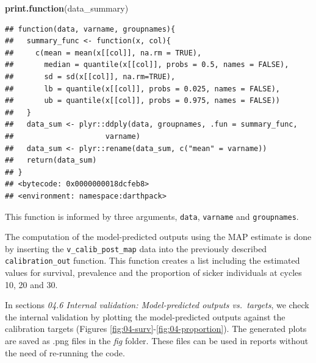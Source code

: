 \documentclass[]{book}
\newenvironment{Shaded}{\begin{snugshade}}{\end{snugshade}}
\newcommand{\KeywordTok}[1]{\textcolor[rgb]{0.13,0.29,0.53}{\textbf{#1}}}
\newcommand{\NormalTok}[1]{#1}
\begin{document}
\begin{Shaded}
\begin{Highlighting}[]
\KeywordTok{print.function}\NormalTok{(data_summary)}
\end{Highlighting}
\end{Shaded}

\begin{verbatim}
## function(data, varname, groupnames){
##   summary_func <- function(x, col){
##     c(mean = mean(x[[col]], na.rm = TRUE),
##       median = quantile(x[[col]], probs = 0.5, names = FALSE),
##       sd = sd(x[[col]], na.rm=TRUE),
##       lb = quantile(x[[col]], probs = 0.025, names = FALSE),
##       ub = quantile(x[[col]], probs = 0.975, names = FALSE))
##   }
##   data_sum <- plyr::ddply(data, groupnames, .fun = summary_func, 
##                     varname)
##   data_sum <- plyr::rename(data_sum, c("mean" = varname))
##   return(data_sum)
## }
## <bytecode: 0x0000000018dcfeb8>
## <environment: namespace:darthpack>
\end{verbatim}

This function is informed by three arguments, \texttt{data}, \texttt{varname} and \texttt{groupnames}.

The computation of the model-predicted outputs using the MAP estimate is done by inserting the \texttt{v\_calib\_post\_map} data into the previously described \texttt{calibration\_out} function. This function creates a list including the estimated values for survival, prevalence and the proportion of sicker individuals at cycles 10, 20 and 30.

In sections \emph{04.6 Internal validation: Model-predicted outputs vs.~targets}, we check the internal validation by plotting the model-predicted outputs against the calibration targets (Figures \ref{fig:04-surv}-\ref{fig:04-proportion}). The generated plots are saved as .png files in the \emph{fig} folder. These files can be used in reports without the need of re-running the code.
\end{document}
